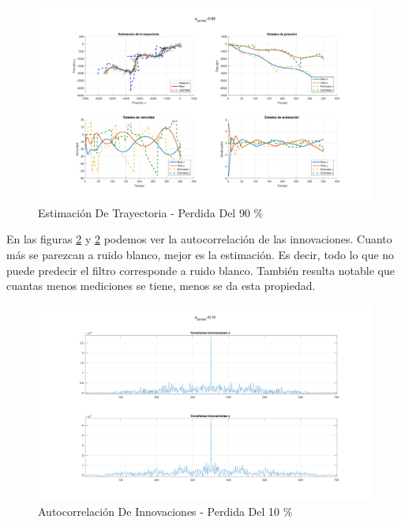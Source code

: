 	\begin{figure}[H]
		\centering
		\includegraphics[scale=0.5,trim={6,5cm 0 0 0}]{Figuras/graf_ej7_2.pdf}
		\caption{Estimación De Trayectoria - Perdida Del 90 \%}
		\label{fig:ej7_2}
	\end{figure}
	
	En las figuras \ref{fig:ej7_1_inov} y \ref{fig:ej7_1_inov} podemos ver la autocorrelación de las innovaciones. Cuanto más se parezcan a ruido blanco, mejor es la estimación. Es decir, todo lo que no puede predecir el filtro corresponde a ruido blanco. También resulta notable que cuantas menos mediciones se tiene, menos se da esta propiedad.
	
	\begin{figure}[H]
		\centering
		\includegraphics[width=1.0\textwidth,keepaspectratio]{Figuras/covinn_ej7_1.pdf}
		\caption{Autocorrelación De Innovaciones - Perdida Del 10 \%}
		\label{fig:ej7_1_inov}
	\end{figure}
	
